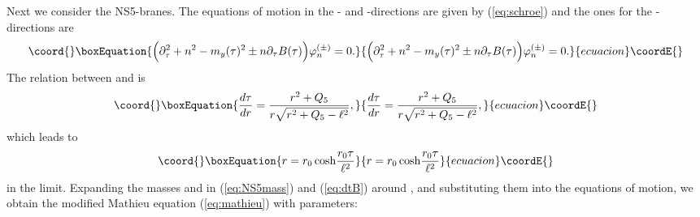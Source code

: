 \documentclass[a4paper,12pt]{article}
\begin{document}
Next we consider the NS5-branes. The equations of motion
in the \coordHE{}- and \coordHE{}-directions are given by (\ref{eq:schroe})
and the ones for the \coordHE{}-directions are 
\begin{equation}\coord{}\boxEquation{
\Big( \partial^2_\tau +n^2 -m_{y}(\tau)^2
\pm n \partial_\tau B(\tau) \Big) \varphi^{(\pm)}_{n}=0.
\label{eq:eomB5}
}{
\Big( \partial^2_\tau +n^2 -m_{y}(\tau)^2
\pm n \partial_\tau B(\tau) \Big) \varphi^{(\pm)}_{n}=0.
}{ecuacion}\coordE{}\end{equation} 
The relation between \myHighlight{$\tau$}\coordHE{} and \coordHE{} is 
\begin{equation}\coord{}\boxEquation{
 {d\tau\over dr}={r^2+Q_{5}\over r\sqrt{r^2+Q_{5}-\ell^2}},
}{
 {d\tau\over dr}={r^2+Q_{5}\over r\sqrt{r^2+Q_{5}-\ell^2}},
}{ecuacion}\coordE{}\end{equation}
which leads to 
\begin{equation}\coord{}\boxEquation{
r=r_{0}\,{\rm cosh }{r_{0}\tau\over \ell^{2}}
\label{eq:trNS5CR}
}{
r=r_{0}\,{\rm cosh }{r_{0}\tau\over \ell^{2}}
}{ecuacion}\coordE{}\end{equation}
in the \coordHE{} limit.
Expanding the masses and \coordHE{} in 
(\ref{eq:NS5mass}) and (\ref{eq:dtB}) around \coordHE{}, 
and substituting them into the equations of motion,
we obtain the modified Mathieu equation (\ref{eq:mathieu})
with parameters:
\end{document}

